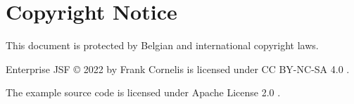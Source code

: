 %

\chapter*{Copyright Notice}
This document is protected by Belgian and international copyright laws.

Enterprise JSF © 2022 by Frank Cornelis is licensed under CC BY-NC-SA 4.0 \cite{CCLicense}.

The example source code is licensed under Apache License 2.0 \cite{ApacheLicense}.
